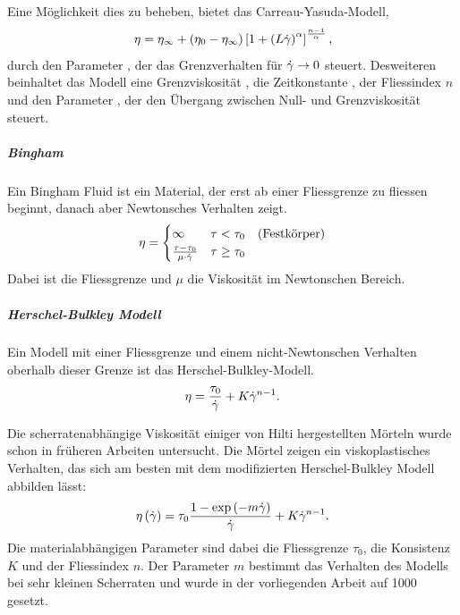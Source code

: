 Eine Möglichkeit dies zu beheben, bietet das Carreau-Yasuda-Modell,
\begin{equation}
    \eta=\eta_\infty+\left( \eta_0-\eta_\infty \right)\left[ 1+\left( L\dot\gamma \right)^\alpha \right] ^{\frac{n-1}{\alpha}},
    \label{eq:fg:carreauyasuda}
\end{equation}
durch den Parameter , der das Grenzverhalten für $\dot\gamma\rightarrow0$ steuert. Desweiteren beinhaltet das Modell eine Grenzviskosität , die Zeitkonstante , der Fliessindex $n$ und den Parameter , der den Übergang zwischen Null- und Grenzviskosität steuert.
%
\subparagraph{Bingham}
Ein Bingham Fluid ist ein Material, der erst ab einer Fliessgrenze zu fliessen beginnt, danach aber Newtonsches Verhalten zeigt.
\begin{equation}
    \eta=
    \begin{cases}
        \infty                           & \tau<\tau_{0}    \quad \text{(Festkörper)}\\
        \frac{\tau-\tau_{0}}{\mu\cdot\dot\gamma} & \tau\geq\tau_{0}
    \end{cases}
    \label{eq:fg:bingham}
\end{equation}
Dabei ist  die Fliessgrenze und $\mu$ die Viskosität im Newtonschen Bereich.
%
\subparagraph{Herschel-Bulkley Modell}
Ein Modell mit einer Fliessgrenze und einem nicht-Newtonschen Verhalten oberhalb dieser Grenze ist das Herschel-Bulkley-Modell.
\begin{equation}
    \eta=  \frac{\tau_0}{\dot\gamma}+K\dot\gamma^{n-1}.
    \label{eq:fg:herschelbulkley}
\end{equation}

Die scherratenabhängige Viskosität einiger von Hilti hergestellten Mörteln wurde schon in früheren Arbeiten untersucht.
Die Mörtel zeigen ein viskoplastisches Verhalten, das sich am besten mit dem modifizierten Herschel-Bulkley Modell abbilden lässt:
\begin{equation}
    \label{eq:modHB}
    \eta\left( \dot\gamma \right) = \tau_0 \frac{1-\exp \left( -m\dot\gamma \right)}{\dot\gamma}+K\dot\gamma^{n-1}.
\end{equation}
Die materialabhängigen Parameter sind dabei die Fliessgrenze $\tau_0$, die Konsistenz $K$ und der Fliessindex $n$. Der Parameter $m$ bestimmt das Verhalten des Modells bei sehr kleinen Scherraten und wurde in der vorliegenden Arbeit auf 1000 gesetzt.%
%
